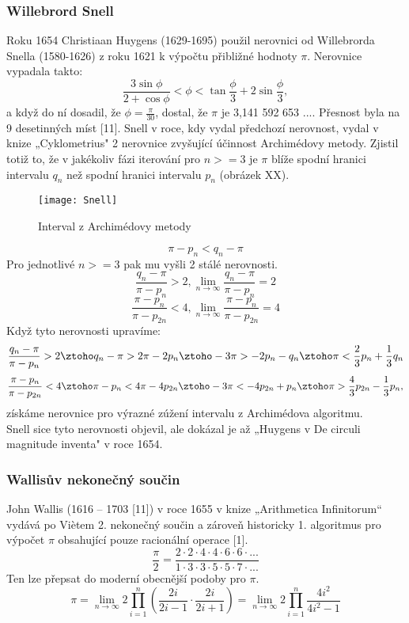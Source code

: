 \documentclass[rocnikovka]{gzwroc} %
\begin{document}
\subsubsection{Willebrord Snell}
Roku 1654 Christiaan Huygens (1629-1695) použil nerovnici od Willebrorda Snella (1580-1626) z roku 1621 k výpočtu přibližné hodnoty $\pi$. Nerovnice vypadala takto:
\begin{equation}
\frac{3\sin\phi}{2+\cos\phi}<\phi<\tan\frac{\phi}{3}+2\sin\frac{\phi}{3},
\end{equation}
a když do ní dosadil, že $\phi  = \frac{\pi}{30}$, dostal, že $\pi$ je 3,141 592 653 .... Přesnost byla na 9 desetinných míst [11].
Snell v roce, kdy vydal předchozí nerovnost, vydal v knize „Cyklometrius" 2 nerovnice zvyšující účinnost Archimédovy metody. Zjistil totiž to, že v jakékoliv fázi iterování pro $n>=3$ je $\pi$ blíže spodní hranici intervalu $q_n$ než spodní hranici intervalu $p_n$ (obrázek XX).
\begin{figure}[!ht]
\texttt{[image: Snell]}
\caption{Interval z Archimédovy metody}
\label{fig:kruh}
\end{figure}
$$
\pi-p_n<q_n-\pi
$$
Pro jednotlivé $n>=3$ pak mu vyšli 2 stálé nerovnosti.
\begin{equation}
\frac{q_n-\pi}{\pi-p_n}>2,  \lim_{n\to\infty} \frac{q_n-\pi}{\pi-p_n}=2
\end{equation}
\begin{equation}
\frac{\pi-p_n}{\pi-p_{2n}}<4,  \lim_{n\to\infty} \frac{\pi-p_n}{\pi-p_{2n}}=4
\end{equation}
Když tyto nerovnosti upravíme:
$$
\frac{q_n-\pi}{\pi-p_n}>2 \ztoho q_n-\pi>2\pi-2p_n \ztoho -3\pi>-2p_n-q_n \ztoho \pi<\frac{2}{3}p_n+\frac{1}{3}q_n
$$
$$
\frac{\pi-p_n}{\pi-p_{2n}}<4 \ztoho \pi-p_n<4\pi-4p_{2n} \ztoho -3\pi<-4p_{2n}+p_n \ztoho \pi>\frac{4}{3}p_{2n}-\frac{1}{3}p_n,
$$
získáme nerovnice pro výrazné zúžení intervalu z Archimédova algoritmu.\\
Snell sice tyto nerovnosti objevil, ale dokázal je až „Huygens v De circuli magnitude inventa" v roce 1654.
\subsubsection{Wallisův nekonečný součin}
John Wallis (1616 – 1703 [11]) v roce 1655 v knize „Arithmetica Infinitorum“ vydává po Viètem 2. nekonečný součin a zároveň historicky 1. algoritmus pro výpočet $\pi$ obsahující pouze racionální operace [1].
\begin{equation}
\frac{\pi}{2}=\frac{2\cdot2\cdot4\cdot4\cdot6\cdot6\cdot...}{1\cdot3\cdot3\cdot5\cdot5\cdot7\cdot...}
\end{equation}
Ten lze přepsat do moderní obecnější podoby pro $\pi$.
$$
\pi=\lim_{n\to\infty}2\prod_{i=1}^{n} \left(\frac{2i}{2i-1}\cdot\frac{2i}{2i+1} \right)=\lim_{n\to\infty}2\prod_{i=1}^{n} \frac{4i^2}{4i^2-1}
$$
\end{document}
